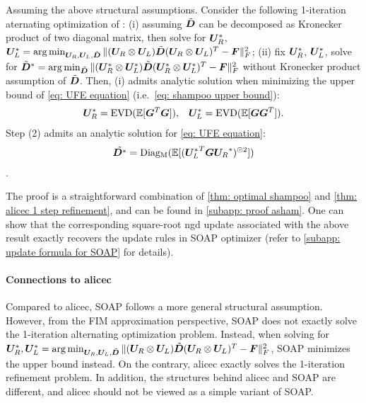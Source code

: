 \begin{theorem}
    Assuming the above structural assumptions.
    Consider the following 1-iteration aternating optimization of : (i) assuming $\tilde{{\bm{D}}}$ can be decomposed as Kronecker product of two diagonal matrix, then solve for ${\bm{U}}_R^*$, ${\bm{U}}_L^* = \arg \min_{{\bm{U}}_R, {\bm{U}}_L, \tilde{{\bm{D}}}} \Vert({\bm{U}}_R\otimes {\bm{U}}_L)\tilde{{\bm{D}}}({\bm{U}}_R\otimes {\bm{U}}_L)^T -\bm{F}\Vert_F^2 $; (ii) fix ${\bm{U}}_R^*$, ${\bm{U}}_L^*$, solve for $\tilde{{\bm{D}}}^* = \arg \min_{\tilde{{\bm{D}}}} \Vert({\bm{U}}_R^*\otimes {\bm{U}}_L^*)\tilde{{\bm{D}}}({\bm{U}}_R^*\otimes {\bm{U}}_L^*)^T -\bm{F}\Vert_F^2$ without Kronecker product assumption of $\tilde{{\bm{D}}}$. Then,
    (i) admits analytic solution when minimizing the upper bound of \cref{eq: UFE equation} (i.e.~\cref{eq: shampoo upper bound}):
    \begin{align*}
        {\bm{U}}_R^* = \operatorname{EVD}(\mathbb{E}[{\bm{G}}^T{\bm{G}}]),\;\;\; {\bm{U}}_L^* = \operatorname{EVD}(\mathbb{E}[{\bm{G}}{\bm{G}}^T]).
    \end{align*} Step (2) admits an analytic solution for \cref{eq: UFE equation}:
    \begin{align*}
        \tilde{{\bm{D}}^*} = \operatorname{Diag_M}(\mathbb{E}[({{\bm{U}}_L^*}^T{\bm{G}}{{\bm{U}}_R}^*)^{\odot 2}])
    \end{align*}. 
    \label{thm: optimal asham}
\end{theorem}
The proof is a straightforward combination of 
\cref{thm: optimal shampoo} and \cref{thm: alicec 1 step refinement}, and can be found in \cref{subapp: proof asham}. One can show that the corresponding square-root \gls{ngd} update associated with the above result exactly recovers the update rules in SOAP optimizer (refer to \cref{subapp: update formula for SOAP} for details). 



\paragraph{Connections to \gls{alicec}} Compared to \gls{alicec}, SOAP follows a more general structural assumption. However, from the FIM approximation perspective, SOAP does not exactly solve the 1-iteration alternating optimization problem. Instead, when solving for ${\bm{U}}_R^*, {\bm{U}}_L^* = \arg \min_{{\bm{U}}_R, {\bm{U}}_L, \tilde{{\bm{D}}}} \Vert({\bm{U}}_R\otimes {\bm{U}}_L)\tilde{{\bm{D}}}({\bm{U}}_R\otimes {\bm{U}}_L)^T -\bm{F}\Vert_F^2$, SOAP minimizes the upper bound instead. On the contrary, \gls{alicec} exactly solves the 1-iteration refinement problem. In addition, the structures behind \gls{alicec} and SOAP are different, and \gls{alicec} should not be viewed as a simple variant of SOAP. 



